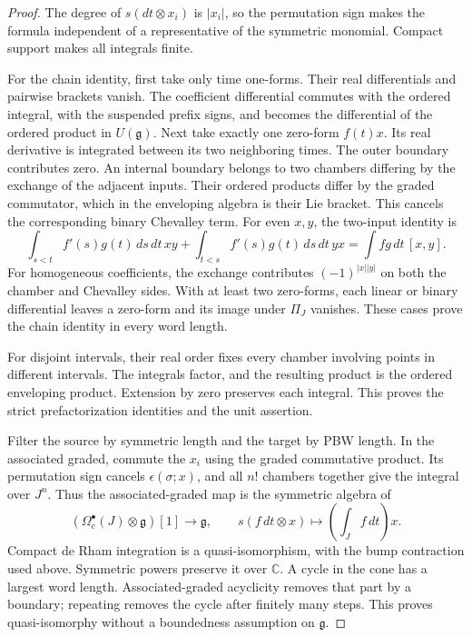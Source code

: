 \begin{proof}
The degree of \(s(dt\otimes x_i)\) is \(|x_i|\), so the
permutation sign makes the formula independent of a representative
of the symmetric monomial. Compact support makes all integrals finite.

For the chain identity, first take only time one-forms. Their real
differentials and pairwise brackets vanish. The coefficient differential
commutes with the ordered integral, with the suspended prefix signs,
and becomes the differential of the ordered product in
\(U(\mathfrak g)\). Next take exactly one zero-form \(f(t)x\).
Its real derivative is integrated between its two neighboring times.
The outer boundary contributes zero. An internal boundary belongs to
two chambers differing by the exchange of the adjacent inputs. Their
ordered products differ by the graded commutator, which in the
enveloping algebra is their Lie bracket. This cancels the corresponding
binary Chevalley term. For even \(x,y\), the two-input identity is
\[
 \int_{s<t}f'(s)g(t)\,ds\,dt\,xy
 +\int_{t<s}f'(s)g(t)\,ds\,dt\,yx
                  =\int fg\,dt\,[x,y].
\]
For homogeneous coefficients, the exchange contributes
\((-1)^{|x||y|}\) on both the chamber and Chevalley sides.
With at least two zero-forms, each linear or binary differential
leaves a zero-form and its image under \(\Pi_J\) vanishes.
These cases prove the chain identity in every word length.

For disjoint intervals, their real order fixes every chamber involving
points in different intervals. The integrals factor, and the resulting
product is the ordered enveloping product. Extension by zero preserves
each integral. This proves the strict prefactorization identities and
the unit assertion.

Filter the source by symmetric length and the target by PBW length.
In the associated graded, commute the \(x_i\) using the graded
commutative product. Its permutation sign cancels
\(\epsilon(\sigma;x)\), and all \(n!\) chambers together give
the integral over \(J^n\). Thus the associated-graded map is the
symmetric algebra of
\[
 (\Omega_c^\bullet(J)\otimes\mathfrak g)[1]
       \longrightarrow\mathfrak g,\qquad
 s(f\,dt\otimes x)\longmapsto\left(\int_J f\,dt\right)x.
\]
Compact de Rham integration is a quasi-isomorphism, with the bump
contraction used above. Symmetric powers preserve it over
\(\mathbb C\). A cycle in the cone has a largest word length.
Associated-graded acyclicity removes that part by a boundary; repeating
removes the cycle after finitely many steps. This proves quasi-isomorphy
without a boundedness assumption on \(\mathfrak g\).


\end{proof}
